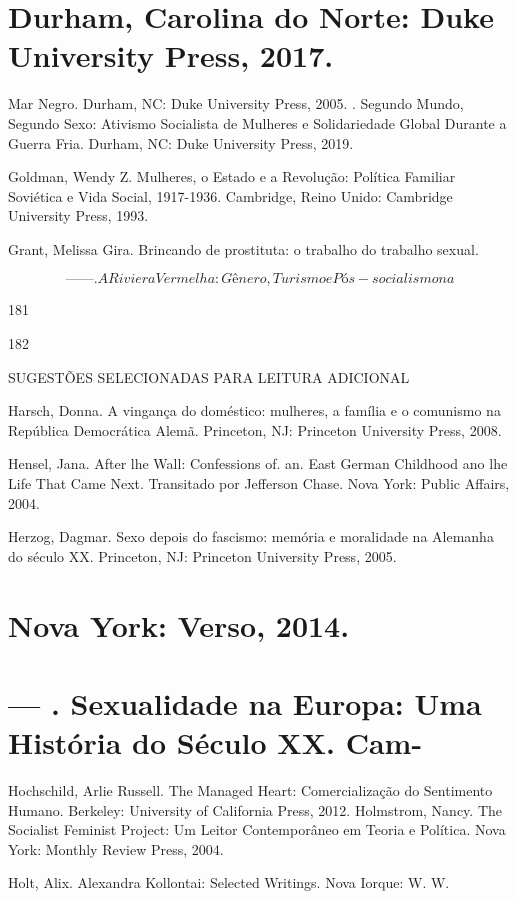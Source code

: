 \section{Durham, Carolina do Norte: Duke University Press, 2017.}
 \par 
Mar Negro. Durham, NC: Duke University Press, 2005. . Segundo Mundo, Segundo Sexo: Ativismo Socialista de Mulheres e Solidariedade Global Durante a Guerra Fria. Durham, NC: Duke University Press, 2019.
 \par 
Goldman, Wendy Z. Mulheres, o Estado e a Revolução: Política Familiar Soviética e Vida Social, 1917-1936. Cambridge, Reino Unido: Cambridge University Press, 1993.
 \par 
Grant, Melissa Gira. Brincando de prostituta: o trabalho do trabalho sexual.
 \par 
\[— —. A Riviera Vermelha: Gênero, Turismo e Pós-socialismo na\]
 \par 
181
 \par 
182
 \par 
SUGESTÕES SELECIONADAS PARA LEITURA ADICIONAL
 \par 
Harsch, Donna. A vingança do doméstico: mulheres, a família e o comunismo na República Democrática Alemã. Princeton, NJ: Princeton University Press, 2008.
 \par 
Hensel, Jana. After lhe Wall: Confessions of. an. East German Childhood ano lhe Life That Came Next. Transitado por Jefferson Chase. Nova York: Public Affairs, 2004.
 \par 
Herzog, Dagmar. Sexo depois do fascismo: memória e moralidade na Alemanha do século XX. Princeton, NJ: Princeton University Press, 2005.
 \par 
\section{Nova York: Verso, 2014.}
 \par 
\section{— . Sexualidade na Europa: Uma História do Século XX. Cam-}
 \par 
Hochschild, Arlie Russell. The Managed Heart: Comercialização do Sentimento Humano. Berkeley: University of California Press, 2012. Holmstrom, Nancy. The Socialist Feminist Project: Um Leitor Contemporâneo em Teoria e Política. Nova York: Monthly Review Press, 2004.
 \par 
Holt, Alix. Alexandra Kollontai: Selected Writings. Nova Iorque: W. W.
 \par 
